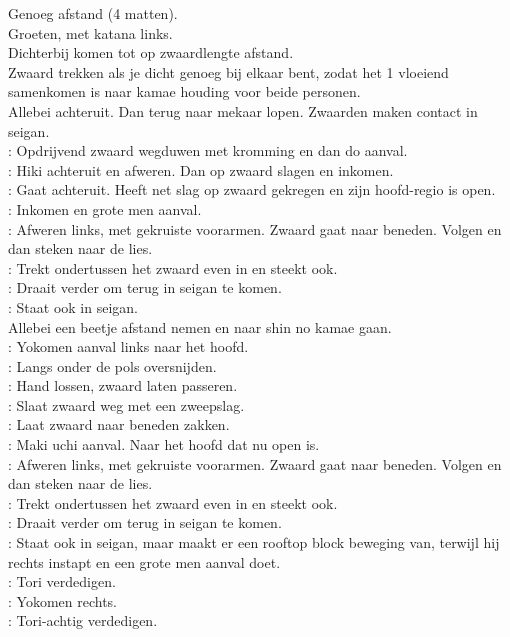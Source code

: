 Genoeg afstand (4 matten).\\
Groeten, met katana links.\\
Dichterbij komen tot op zwaardlengte afstand.\\
Zwaard trekken als je dicht genoeg bij elkaar bent, zodat het 1 vloeiend samenkomen is naar kamae houding voor beide personen.\\
Allebei achteruit. Dan terug naar mekaar lopen. Zwaarden maken contact in seigan.\\
\pA: Opdrijvend zwaard wegduwen met kromming en dan do aanval.\\
\pB: Hiki achteruit en afweren. Dan op zwaard slagen en inkomen.\\
\pA: Gaat achteruit. Heeft net slag op zwaard gekregen en zijn hoofd-regio is open.\\
\pB: Inkomen en grote men aanval.\\
\pA: Afweren links, met gekruiste voorarmen. Zwaard gaat naar beneden. Volgen en dan steken naar de lies.\\
\pB: Trekt ondertussen het zwaard even in en steekt ook.\\
\pA: Draait verder om terug in seigan te komen.\\
\pB: Staat ook in seigan.\\
Allebei een beetje afstand nemen en naar shin no kamae gaan.\\
\pA: Yokomen aanval links naar het hoofd.\\
\pB: Langs onder de pols oversnijden.\\
\pA: Hand lossen, zwaard laten passeren.\\
\pB: Slaat zwaard weg met een zweepslag.\\
\pA: Laat zwaard naar beneden zakken.\\
\pB: Maki uchi aanval. Naar het hoofd dat nu open is.\\
\pA: Afweren links, met gekruiste voorarmen. Zwaard gaat naar beneden. Volgen en dan steken naar de lies.\\
\pB: Trekt ondertussen het zwaard even in en steekt ook.\\
\pA: Draait verder om terug in seigan te komen.\\
\pB: Staat ook in seigan, maar maakt er een rooftop block beweging van, terwijl hij rechts instapt en een grote men aanval doet.\\
\pA: Tori verdedigen.\\
\pB: Yokomen rechts.\\
\pA: Tori-achtig verdedigen.\\
